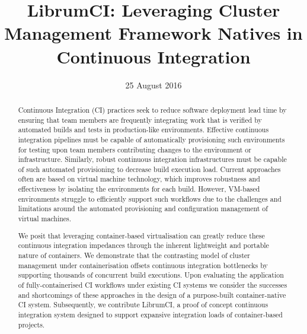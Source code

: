 \documentclass[journal]{IEEEtran}
\begin{document}
\title{LibrumCI: Leveraging Cluster Management Framework Natives in Continuous Integration}

\author{
}
    
\date{25 August 2016}

\maketitle

\begin{abstract}
Continuous Integration (CI) practices seek to reduce software deployment lead time
by ensuring that team members are frequently integrating work that is 
verified by automated builds and tests in production-like environments. 
Effective continuous integration pipelines must be capable of automatically
provisioning such environments for testing upon team members contributing 
changes to the environment or infrastructure. Similarly,
robust continuous integration infrastructures must be capable of such
automated provisioning to decrease build execution load. 
Current approaches often are based on virtual machine technology,
 which improves robustness and effectiveness by isolating the environments for each build. 
However, VM-based environments struggle to efficiently support such workflows due to the 
challenges and limitations  around the automated provisioning and configuration management of virtual machines.
\par
We posit that leveraging container-based virtualisation can greatly reduce
these continuous integration impedances through the inherent lightweight and portable nature of containers. 
We demonstrate that the contrasting model of cluster management under containerisation offsets continuous
integration bottlenecks by supporting thousands of concurrent build executions.
Upon evaluating the application of fully-containerised CI workflows under existing CI systems 
we consider the successes and shortcomings of these approaches in the design of a purpose-built container-native
CI system. Subsequently, we contribute LibrumCI, a proof of concept continuous integration system designed 
to support expansive integration loads of container-based projects. 
\end{abstract}
\end{document}
